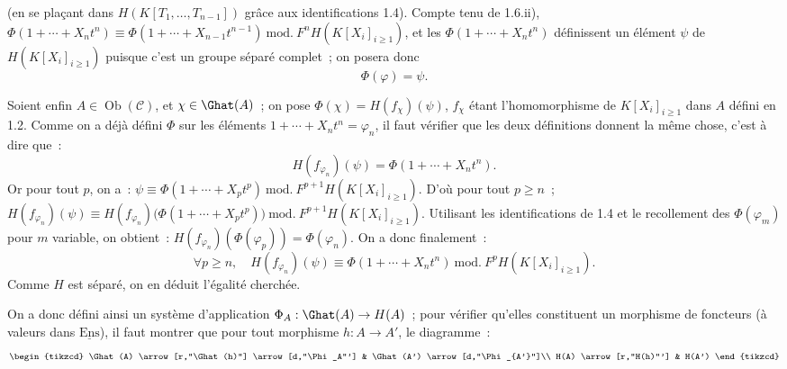 (en se plaçant
dans \(H(K[T_1,\ldots,T_{n-1}])\) grâce aux identifications 1.4). Compte tenu de 1.6.ii), \(\Phi(1+\cdots+X_nt^n)\equiv\Phi(1+\cdots+X_{n-1}t^{n-1})\ \mathrm{mod.}\ F^nH(K[X_i]_{i\geq1})\), et les \(\Phi(1+\cdots+X_nt^n)\) définissent un élément \(\psi\) de \(H(K[X_i]_{i\geq1})\) puisque c'est un groupe séparé complet~; on posera donc
\[
  \Phi(\varphi)=\psi .
\]

Soient enfin \(A\in\operatorname{Ob}(\mathcal C)\), et \(\chi\in\Ghat(A)\)~; on pose \(\Phi(\chi)=H(f_\chi)(\psi)\), \(f_\chi\) étant l'homomorphisme de \(K[X_i]_{i\geq 1}\) dans \(A\) défini en 1.2. Comme on a déjà défini \(\Phi\) sur les éléments \(1+\cdots+X_nt^n=\varphi_n\), il faut vérifier que les deux définitions donnent la même chose, c'est à dire que~:
\[
  H(f_{\varphi_n})(\psi)=\Phi(1+\cdots+X_nt^n).
\]
Or pour tout \(p\), on a~: \(\psi\equiv \Phi(1+\cdots+X_pt^p)\ \mathrm{mod.}\ F^{p+1}H(K[X_i]_{i\geq 1})\). D'où pour tout \(p\geq n\)~; \(H(f_{\varphi_n})(\psi)\equiv H(f_{\varphi_n})\bigl(\Phi(1+\cdots+X_pt^p)\bigr)\ \mathrm{mod.}\ F^{p+1}H(K[X_i]_{i\geq 1})\). Utilisant les identifications de 1.4 et le recollement des \(\Phi(\varphi_m)\) pour \(m\) variable, on obtient~: \(H(f_{\varphi_n})(\Phi(\varphi_p))=\Phi(\varphi_n)\).
On a donc finalement~:
\[
  \forall p\geq n,\quad
  H(f_{\varphi_n})(\psi)\equiv \Phi(1+\cdots+X_nt^n)
  \ \mathrm{mod.}\ F^pH(K[X_i]_{i\geq 1}).
\]
Comme \(H\) est séparé, on en déduit l'égalité cherchée.

On a donc défini ainsi un système d'application \(\Phi_A:\Ghat(A)\to H(A)\)~; pour vérifier qu'elles constituent un morphisme de foncteurs (à valeurs dans \(\underline{\mathrm{Ens}}\)), il faut montrer que pour tout morphisme \(h:A\to A'\), le diagramme~:
\[
\begin{tikzcd}
\Ghat(A) \arrow[r,"\Ghat(h)"] \arrow[d,"\Phi_A"'] &
\Ghat(A') \arrow[d,"\Phi_{A'}"]\\
H(A) \arrow[r,"H(h)"'] & H(A')
\end{tikzcd}
\]

